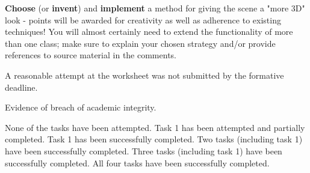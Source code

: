 \documentclass{../../../fal_assignment}
\begin{document}
\textbf{Choose} (or \textbf{invent}) and \textbf{implement} a method for giving the scene a "more 3D" look - points will be awarded for creativity as well as adherence to existing techniques! You will almost certainly need to extend the functionality of more than one class; make sure to explain your chosen strategy and/or provide references to source material in the comments.

\begin{markingrubric}

		\grade\fail	A reasonable attempt at the worksheet was not submitted by the formative deadline.
		\par Evidence of breach of academic integrity.
		
        \grade\fail None of the tasks have been attempted.
		\grade Task 1 has been attempted and partially completed.
		\grade Task 1 has been successfully completed.
		\grade Two tasks (including task 1) have been successfully completed.
		\grade Three tasks (including task 1) have been successfully completed.
		\grade All four tasks have been successfully completed.


\end{markingrubric}
\end{document}
